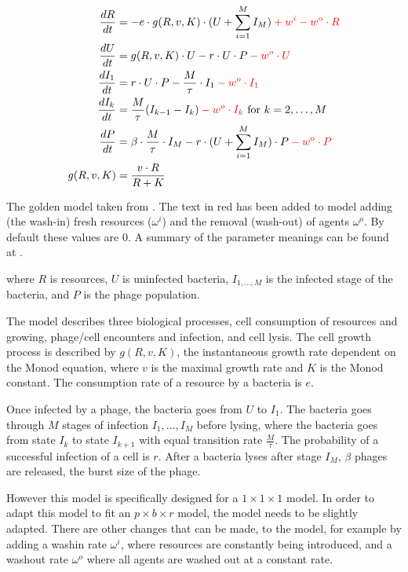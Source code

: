 \begin{eqfloat}
    \begin{align}
        \frac{dR}{dt} &= -e \cdot g(R, v, K)\cdot (U + \sum_{i=1}^{M} I_M) \mathcolor{red}{+ w^i -w^o \cdot R}\\
        \frac{dU}{dt} &= g(R, v, K)\cdot U - r\cdot U \cdot P \mathcolor{red}{-w^o \cdot U}\\
        \frac{dI_1}{dt} &= r\cdot U \cdot P - \frac{M}{\tau}\cdot I_1 \mathcolor{red}{-w^o \cdot I_1}\\
        \frac{dI_k}{dt} &= \frac{M}{\tau}(I_{k-1}-I_k) \mathcolor{red}{-w^o \cdot I_k}\text{ for } k=2, \dots, M \\
        \frac{dP}{dt} &= \beta \cdot\frac{M}{\tau} \cdot I_M - r\cdot(U + \sum_{i=1}^{M} I_M)\cdot P \mathcolor{red}{-w^o \cdot P} \\
        g(R, v, K) &= \frac{v\cdot R}{R + K}
        \label{eq:golden_model}
    \end{align}
    \caption{
        The golden model taken from \citet{gengUsingBacterialPopulation2024}. 
        The text in red has been added to model adding (the wash-in) fresh resources ($\omega^i$) 
        and the removal (wash-out) of agents $\omega^o$. By default these values are 0.
        A summary of the parameter meanings can be found at . 
    }
\end{eqfloat}

where $R$ is resources, $U$ is uninfected bacteria, $I_{1, \dots, M}$ is the infected stage of the bacteria, and $P$ is the phage population. 

The model describes three biological processes, cell consumption of resources and growing, phage/cell encounters and infection, and cell lysis. 
The cell growth process is described by $g(R, v, K)$, the instantaneous growth rate dependent on the Monod equation, where $v$ is the maximal growth rate and $K$ is the Monod constant. 
The consumption rate of a resource by a bacteria is $e$. 

Once infected by a phage, the bacteria goes from $U$ to $I_1$. 
The bacteria goes through $M$ stages of infection $I_1, \dots, I_M$ before lysing, where the bacteria goes from state $I_k$ to state $I_{k+1}$ with equal transition rate $\frac{M}{\tau}$. The probability of a successful infection of a cell is $r$. 
After a bacteria lyses after stage $I_M$, $\beta$ phages are released, the burst size of the phage. 

However this model is specifically designed for a $1\times 1 \times 1$ model. 
In order to adapt this model to fit an $p \times b \times r$ model, the model needs to be slightly adapted. 
There are other changes that can be made, to the model, for example by adding a washin rate $\omega^{i}$, where resources are constantly being introduced, and a washout rate $\omega^{o}$ where all agents are washed out at a constant rate. 

